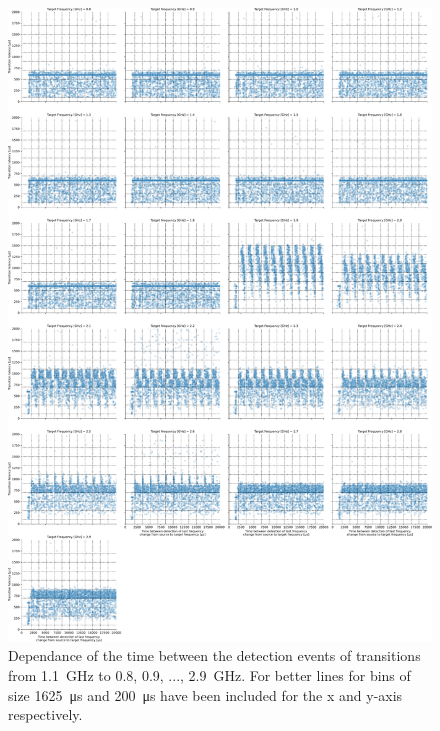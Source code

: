 \begin{figure}[]
    \centering
    \includegraphics[width=\columnwidth]{fig/ftalat_scatter_wait_transition_latency_hati_source_1.1.pdf}
    \caption{Dependance of the time between the detection events of transitions from \SI{1.1}{\GHz} to \SI{0.8}{}, \SI{0.9}{}, ..., \SI{2.9}{\GHz}. For better lines for bins of size \SI{1625}{\us} and \SI{200}{\us} have been included for the x and y-axis respectively.}
\end{figure}
